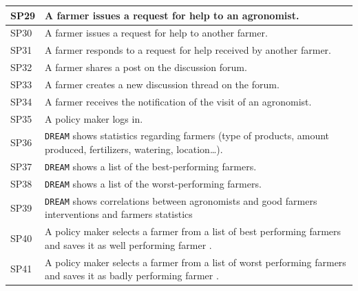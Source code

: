 \documentclass{article}
\begin{document}
\begin{longtable}[c]{|m{0.75cm}|m{11cm}|}
 \hline
 SP29 & A farmer issues a request for help to an agronomist.\\
 \hline
 SP30 & A farmer issues a request for help to another farmer.\\
 \hline
 SP31 & A farmer responds to a request for help received by another farmer.\\
 \hline
 SP32 & A farmer shares a post on the discussion forum.\\
 \hline
 SP33 & A farmer creates a new discussion thread on the forum.\\
 \hline
  SP34 & A farmer receives the notification of the visit of an agronomist.\\
 \hline

 SP35 & A policy maker logs in.\\
 \hline
 SP36 & \verb|DREAM| shows statistics regarding farmers (type of products, amount produced, fertilizers, watering, location…).\\
 \hline
 SP37 & \verb|DREAM| shows a list of the best-performing farmers.\\
 \hline
 SP38 & \verb|DREAM| shows a list of the worst-performing farmers.\\
 \hline
 SP39 & \verb|DREAM| shows correlations between agronomists and good farmers interventions and farmers statistics\\
 \hline
 SP40 &  A policy maker selects a farmer from a list of best performing farmers and saves it as well performing farmer .\\
 \hline
 SP41 & A policy maker selects a farmer from a list of worst performing farmers and saves it as badly performing farmer .\\
 \hline


\end{longtable}
\end{document}
